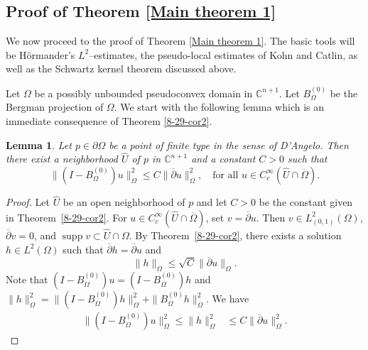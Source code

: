 \documentclass[a4paper,centertags,oneside,12pt]{amsart}
\newtheorem{lemma}[theorem]{Lemma}
\numberwithin{equation}{section}
\begin{document}
\subsection{Proof of Theorem \ref{Main theorem 1}}

We now proceed to the proof of Theorem \ref{Main theorem 1}. The basic tools will be H\"ormander’s  $L^2$--estimates, the pseudo-local estimates of Kohn and Catlin, as well as the Schwartz kernel theorem discussed above.


Let \( \Omega \) be a possibly unbounded pseudoconvex domain in \( \mathbb{C}^{n+1} \). Let $B_\Omega^{(0)}$ be the Bergman projection of $\Omega$. We start with the following lemma which is an immediate consequence of Theorem \ref{8-29-cor2}.



\begin{lemma}\label{8-31-prop1}
Let $p\in\partial\Omega$ be a point of finite type in the sense of D'Angelo. Then there exist a neighborhood $\widehat U$ of $p$ in $\mathbb C^{n+1}$ and a constant $C>0$ such that
\begin{equation}\label{local closed range}
    \|(I-B_\Omega^{(0)})u\|^2_\Omega\leq C\|\overline\partial u\|^2_\Omega,\quad \text{for all } u\in C_c^\infty(\widehat U\cap\overline \Omega).
\end{equation}
\end{lemma}
\begin{proof}
Let $\widehat U$ be an open neighborhood of $p$ and let $C>0$ be the constant given in Theorem~\ref{8-29-cor2}. 
For $u\in C_c^\infty(\widehat U\cap\overline\Omega)$, set $v=\overline\partial u$. Then $v\in L^2_{(0,1)}(\Omega)$, $\overline\partial v=0$, and $\operatorname{supp} v\subset \widehat U\cap\Omega$. By Theorem~\ref{8-29-cor2}, there exists a solution $h\in L^2(\Omega)$ such that $\overline\partial h=\overline\partial u$ and 
    \begin{equation*}\label{8-29-a1}
    \|h\|_\Omega\leq \sqrt{C}\|\overline\partial u\|_\Omega.
    \end{equation*} 
Note that $(I-B_\Omega^{(0)})u=(I-B_\Omega^{(0)})h$ and $\|h\|^2_\Omega= \|(I-B_\Omega^{(0)})h\|^2_\Omega+ \|B_\Omega^{(0)}h\|_\Omega^2$. 
We have
    \begin{equation*}
    \begin{split}
        \|(I-B_\Omega^{(0)})u\|^2_\Omega\leq\|h\|^2_\Omega
        &\leq C\|\overline\partial u\|^2_\Omega.
        \end{split}
    \end{equation*}
\end{proof}
\end{document}
